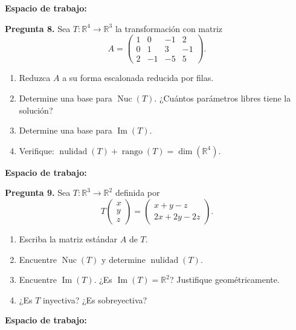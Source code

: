 \documentclass[12pt, letterpaper]{article}
\newcommand{\R}{\mathbb{R}}
\newcommand{\Ker}{\operatorname{Nuc}}   %
\newcommand{\Img}{\operatorname{Im}}    %
\newcommand{\rango}{\operatorname{rango}}
\newcommand{\nulidad}{\operatorname{nulidad}}
\newcommand{\mat}[1]{\begin{pmatrix}#1\end{pmatrix}}
\begin{document}
\vspace{4pt}

\noindent\textbf{Espacio de trabajo:}
\vspace{7cm}

\begin{cajapregunta}
\textbf{Pregunta 8.}
Sea $T:\R^4\to\R^3$ la transformación con matriz
\[
  A = \mat{1 & 0 & -1 & 2 \\ 0 & 1 & 3 & -1 \\ 2 & -1 & -5 & 5}.
\]
\begin{enumerate}[label=\alph*)]
  \item Reduzca $A$ a su forma escalonada reducida por filas.
  \item Determine una base para $\Ker(T)$. ¿Cuántos parámetros libres tiene la solución?
  \item Determine una base para $\Img(T)$.
  \item Verifique: $\nulidad(T) + \rango(T) = \dim(\R^4)$.
\end{enumerate}
\end{cajapregunta}

\vspace{4pt}

\noindent\textbf{Espacio de trabajo:}
\vspace{7cm}

\newpage

\begin{cajapregunta}
\textbf{Pregunta 9.}
Sea $T:\R^3\to\R^2$ definida por
\[
  T\!\mat{x\\y\\z} = \mat{x + y - z \\ 2x + 2y - 2z}.
\]
\begin{enumerate}[label=\alph*)]
  \item Escriba la matriz estándar $A$ de $T$.
  \item Encuentre $\Ker(T)$ y determine $\nulidad(T)$.
  \item Encuentre $\Img(T)$. ¿Es $\Img(T) = \R^2$? Justifique geométricamente.
  \item ¿Es $T$ inyectiva? ¿Es sobreyectiva?
\end{enumerate}
\end{cajapregunta}

\vspace{4pt}

\noindent\textbf{Espacio de trabajo:}
\vspace{7cm}
\end{document}
